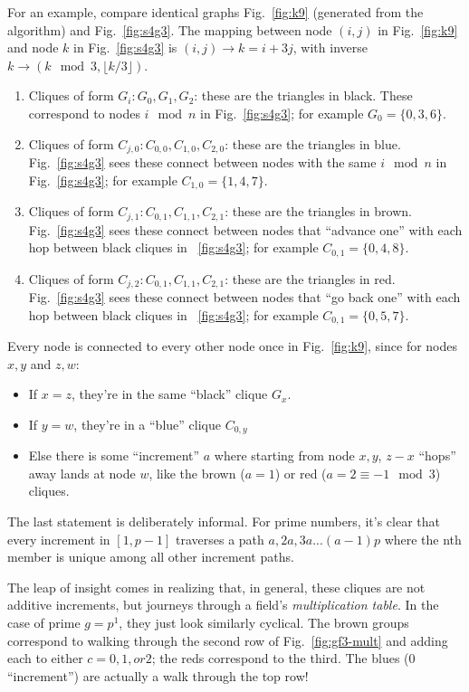 \documentclass[11pt, oneside]{article} 	%
\begin{document}
For an example, compare identical graphs Fig.~\ref{fig:k9} (generated from the algorithm) and Fig.~\ref{fig:s4g3}. The mapping between node $(i,j)$ in Fig.~\ref{fig:k9} and node $k$ in Fig.~\ref{fig:s4g3} is $(i,j) \rightarrow k=i+3j$, with inverse $k \rightarrow (k \mod 3, \lfloor k / 3 \rfloor)$.

\begin{enumerate}
\item Cliques of form $G_i: G_0, G_1, G_2$: these are the triangles in black. These correspond to nodes $i \mod n$ in Fig.~\ref{fig:s4g3}; for example $G_0 = \{0, 3, 6\}$.
\item Cliques of form $C_{j, 0}: C_{0,0}, C_{1, 0}, C_{2,0}$: these are the triangles in blue. Fig.~\ref{fig:s4g3} sees these connect between nodes with the same $i \mod n$ in Fig.~\ref{fig:s4g3}; for example $C_{1,0} = \{1, 4, 7\}$.
\item Cliques of form $C_{j, 1}: C_{0,1}, C_{1, 1}, C_{2,1}$: these are the triangles in brown. Fig.~\ref{fig:s4g3} sees these connect between nodes that ``advance one'' with each hop between black cliques in ~\ref{fig:s4g3}; for example $C_{0,1} = \{0, 4, 8\}$.
\item Cliques of form $C_{j, 2}: C_{0,1}, C_{1, 1}, C_{2,1}$: these are the triangles in red. Fig.~\ref{fig:s4g3} sees these connect between nodes that ``go back one'' with each hop between black cliques in ~\ref{fig:s4g3}; for example $C_{0,1} = \{0, 5, 7\}$.
\end{enumerate}


Every node is connected to every other node once in Fig.~\ref{fig:k9}, since for nodes $x,y$ and $z,w$:
\begin{itemize}
\item If $x = z$, they're in the same ``black'' clique $G_x$.
\item If $y=w$, they're in a ``blue'' clique $C_{0,y}$
\item Else there is some ``increment'' $a$ where starting from node $x,y$, $z-x$ ``hops'' away lands at node $w$, like the brown ($a=1$) or red ($a=2\equiv -1 \mod 3 $) cliques.
\end{itemize}


The last statement is deliberately informal. For prime numbers, it's clear that every increment in $[1, p-1]$ traverses a path $a, 2a, 3a ... (a-1)p$ where the nth member is unique among all other increment paths.

The leap of insight comes in realizing that, in general, these cliques are not additive increments, but journeys through a field's \emph{multiplication table}. In the case of prime $g=p^1$, they just look similarly cyclical. The brown groups correspond to walking through the second row of Fig.~\ref{fig:gf3-mult} and adding each to either $c=0, 1, or 2$; the reds correspond to the third. The blues (0 ``increment'') are actually a walk through the top row!
\end{document}
